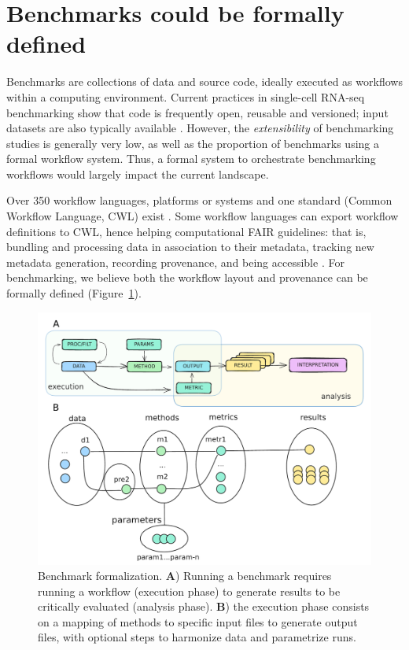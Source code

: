 \documentclass[11pt]{article}
\begin{document}
\section*{Benchmarks could be formally defined}

Benchmarks are collections of data and source code, ideally executed as workflows within a computing environment. Current practices in single-cell RNA-seq benchmarking show that code is frequently open, reusable and versioned; input datasets are also typically available \cite{Sonrel2023-te}. However, the \textit{extensibility} of benchmarking studies is generally very low, as well as the proportion of benchmarks using a formal workflow system. Thus, a formal system to orchestrate benchmarking workflows would largely impact the current landscape.

Over 350 workflow languages, platforms or systems  \cite{Wratten2021-el, Amstutz2024-qk} and one standard (Common Workflow Language, CWL) exist \cite{Amstutz2016-vo}. Some workflow languages can export workflow definitions to CWL, hence helping computational FAIR guidelines: that is, bundling and processing data in association to their metadata, tracking new metadata generation, recording provenance, and being accessible \cite{Goble2020-ps}. For benchmarking, we believe both the workflow layout and provenance can be formally defined (Figure~\ref{fig:formalization}). 


\begin{figure}
    \centering
    \includegraphics[width=0.75\linewidth]{figures/bens_formalization.pdf}
    \caption[Benchmark formalization.]{Benchmark formalization. \textbf{A}) Running a benchmark requires running a workflow (execution phase) to generate results to be critically evaluated (analysis phase). \textbf{B}) the execution phase consists on a mapping of methods to specific input files to generate output files, with optional steps to harmonize data and parametrize runs.}
    \label{fig:formalization}
\end{figure}
\end{document}
